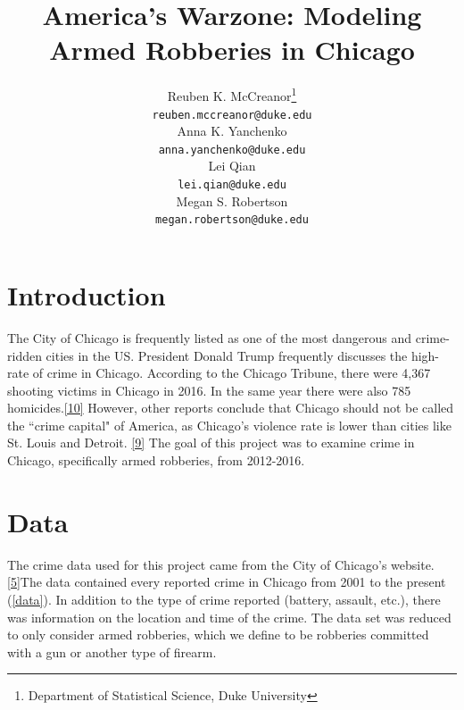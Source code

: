 \documentclass{article} %
\title{America's Warzone: Modeling Armed Robberies in Chicago}
\author{
Reuben K. McCreanor\thanks{Department of Statistical Science, Duke University} \\  
\texttt{reuben.mccreanor@duke.edu} \\
\And
Anna K. Yanchenko\footnotemark[1] \\
\texttt{anna.yanchenko@duke.edu} \\
\And 
Lei Qian\footnotemark[1] \\
\texttt{lei.qian@duke.edu} \\
\And
Megan S. Robertson\footnotemark[1] \\
\texttt{megan.robertson@duke.edu} \\ 
}
\begin{document}
\maketitle

\section{Introduction}
\label{headings}

\noindent The City of Chicago is frequently listed as one of the most dangerous and crime-ridden cities in the US. President Donald Trump frequently discusses the high-rate of crime in Chicago. According to the Chicago Tribune, there were 4,367 shooting victims in Chicago in 2016. In the same year there were also 785 homicides.\hyperlink{Ref10}{[10]} However, other reports conclude that Chicago should not be called the ``crime capital" of America, as Chicago's violence rate is lower than cities like St.  Louis and Detroit. \hyperlink{Ref9}{[9]} The goal of this project was to examine crime in Chicago, specifically armed robberies, from 2012-2016. \newline

\section{Data}
\label{headings}

\noindent The crime data used for this project came from the City of Chicago's website. \hyperlink{Ref5}{[5]}The data contained every reported crime in Chicago from 2001 to the present (\autoref{data}). In addition to the type of crime reported (battery, assault, etc.), there was information on the location and time of the crime. The data set was reduced to only consider armed robberies, which we define to be robberies committed with a gun or another type of firearm. 
\end{document}
